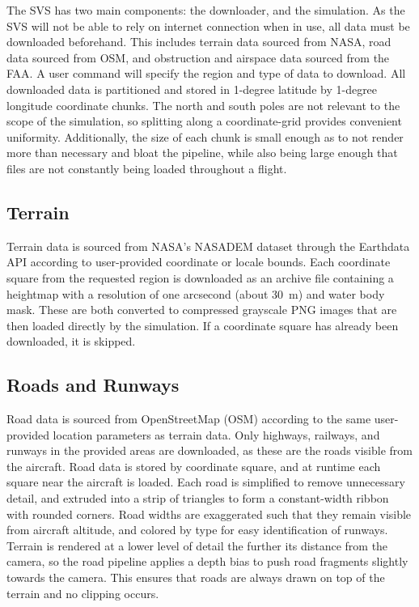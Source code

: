 \documentclass[journal ]{new-aiaa}
\begin{document}
The SVS has two main components: the downloader, and the simulation. As the SVS will not be able to rely on internet connection when in use, all data must be downloaded beforehand. This includes terrain data sourced from NASA, road data sourced from OSM, and obstruction and airspace data sourced from the FAA. A user command will specify the region and type of data to download. All downloaded data is partitioned and stored in 1-degree latitude by 1-degree longitude coordinate chunks. The north and south poles are not relevant to the scope of the simulation, so splitting along a coordinate-grid provides convenient uniformity. Additionally, the size of each chunk is small enough as to not render more than necessary and bloat the pipeline, while also being large enough that files are not constantly being loaded throughout a flight.

\subsection{Terrain}
Terrain data is sourced from NASA's NASADEM dataset through the Earthdata API according to user-provided coordinate or locale bounds. Each coordinate square from the requested region is downloaded as an archive file containing a heightmap with a resolution of one arcsecond (about 30~m) and water body mask. These are both converted to compressed grayscale PNG images that are then loaded directly by the simulation. If a coordinate square has already been downloaded, it is skipped.
\subsection{Roads and Runways}
Road data is sourced from OpenStreetMap (OSM) according to the same user-provided location parameters as terrain data. Only highways, railways, and runways in the provided areas are downloaded, as these are the roads visible from the aircraft. Road data is stored by coordinate square, and at runtime each square near the aircraft is loaded. Each road is simplified to remove unnecessary detail, and extruded into a strip of triangles to form a constant-width ribbon with rounded corners. Road widths are exaggerated such that they remain visible from aircraft altitude, and colored by type for easy identification of runways. Terrain is rendered at a lower level of detail the further its distance from the camera, so the road pipeline applies a depth bias to push road fragments slightly towards the camera. This ensures that roads are always drawn on top of the terrain and no clipping occurs.
\end{document}
